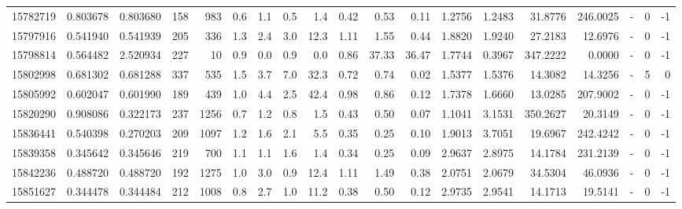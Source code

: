 \begin{tabular}{rrrrrrrrrrrrrrrrlrr}
  15782719 & 0.803678 &   0.803680 &  158 &  983 &      0.6 &      1.1 &     0.5 &      1.4 &       0.42 &        0.53 &        0.11 &  1.2756 &  1.2483 &   31.8776 &  246.0025 &             - &        0 &         -1 \\
  15797916 & 0.541940 &   0.541939 &  205 &  336 &      1.3 &      2.4 &     3.0 &     12.3 &       1.11 &        1.55 &        0.44 &  1.8820 &  1.9240 &   27.2183 &   12.6976 &             - &        0 &         -1 \\
  15798814 & 0.564482 &   2.520934 &  227 &   10 &      0.9 &      0.0 &     0.9 &      0.0 &       0.86 &       37.33 &       36.47 &  1.7744 &  0.3967 &  347.2222 &    0.0000 &             - &        0 &         -1 \\
  15802998 & 0.681302 &   0.681288 &  337 &  535 &      1.5 &      3.7 &     7.0 &     32.3 &       0.72 &        0.74 &        0.02 &  1.5377 &  1.5376 &   14.3082 &   14.3256 &             - &        5 &          0 \\
  15805992 & 0.602047 &   0.601990 &  189 &  439 &      1.0 &      4.4 &     2.5 &     42.4 &       0.98 &        0.86 &        0.12 &  1.7378 &  1.6660 &   13.0285 &  207.9002 &             - &        0 &         -1 \\
  15820290 & 0.908086 &   0.322173 &  237 & 1256 &      0.7 &      1.2 &     0.8 &      1.5 &       0.43 &        0.50 &        0.07 &  1.1041 &  3.1531 &  350.2627 &   20.3149 &             - &        0 &         -1 \\
  15836441 & 0.540398 &   0.270203 &  209 & 1097 &      1.2 &      1.6 &     2.1 &      5.5 &       0.35 &        0.25 &        0.10 &  1.9013 &  3.7051 &   19.6967 &  242.4242 &             - &        0 &         -1 \\
  15839358 & 0.345642 &   0.345646 &  219 &  700 &      1.1 &      1.1 &     1.6 &      1.4 &       0.34 &        0.25 &        0.09 &  2.9637 &  2.8975 &   14.1784 &  231.2139 &             - &        0 &         -1 \\
  15842236 & 0.488720 &   0.488720 &  192 & 1275 &      1.0 &      3.0 &     0.9 &     12.4 &       1.11 &        1.49 &        0.38 &  2.0751 &  2.0679 &   34.5304 &   46.0936 &             - &        0 &         -1 \\
  15851627 & 0.344478 &   0.344484 &  212 & 1008 &      0.8 &      2.7 &     1.0 &     11.2 &       0.38 &        0.50 &        0.12 &  2.9735 &  2.9541 &   14.1713 &   19.5141 &             - &        0 &         -1 \\

\end{tabular}
